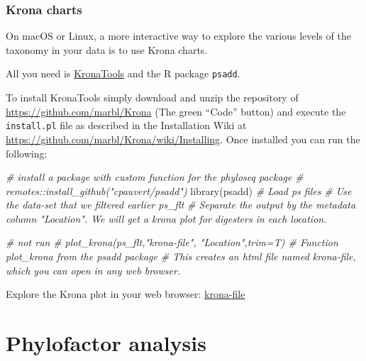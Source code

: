 \documentclass[
]{book}
\newenvironment{Shaded}{\begin{snugshade}}{\end{snugshade}}
\newcommand{\CommentTok}[1]{\textcolor[rgb]{0.56,0.35,0.01}{\textit{#1}}}
\newcommand{\FunctionTok}[1]{\textcolor[rgb]{0.00,0.00,0.00}{#1}}
\newcommand{\NormalTok}[1]{#1}
\begin{document}
\hypertarget{krona-charts}{%
\subsection{Krona charts}\label{krona-charts}}

On macOS or Linux, a more interactive way to explore the various levels of the taxonomy in your data is to use Krona charts.

All you need is \href{https://github.com/marbl/Krona/wiki/KronaTools}{KronaTools} and the R package \texttt{psadd}.

To install KronaTools simply download and unzip the repository of \url{https://github.com/marbl/Krona} (The green ``Code'' button) and execute the \texttt{install.pl} file as described in the Installation Wiki at \url{https://github.com/marbl/Krona/wiki/Installing}. Once installed you can run the following:

\begin{Shaded}
\begin{Highlighting}[]
\CommentTok{\# install a package with custom function for the phyloseq package}
\CommentTok{\# remotes::install\_github("cpauvert/psadd")}
\FunctionTok{library}\NormalTok{(psadd)}
\CommentTok{\# Load ps files }
\CommentTok{\# Use the data{-}set that we filtered earlier \textquotesingle{}ps\_flt\textquotesingle{}}
\CommentTok{\# Separate the output by the metadata column "Location". We will get a krona plot for digesters in each location.}

\CommentTok{\# not run}
\CommentTok{\# plot\_krona(ps\_flt,"krona{-}file", "Location",trim=T) \# Function plot\_krona from the psadd package}
\CommentTok{\# This creates an \textquotesingle{}html\textquotesingle{} file named \textquotesingle{}krona{-}file, which you can open in any web browser. }
\end{Highlighting}
\end{Shaded}

Explore the Krona plot in your web browser: \href{./krona-file/krona-file.html}{krona-file}

\hypertarget{phylofactor}{%
\chapter{Phylofactor analysis}\label{phylofactor}}
\end{document}
